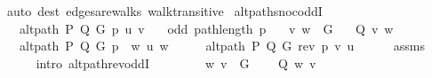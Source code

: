 \begin{isabellebody}
\ {\isacharparenleft}{\kern0pt}auto\ dest{\isacharcolon}{\kern0pt}\ edges{\isacharunderscore}{\kern0pt}are{\isacharunderscore}{\kern0pt}walks\ walk{\isacharunderscore}{\kern0pt}transitive{\isacharparenright}{\kern0pt}\isanewline
{}\isamarkupfalse%
%
\endisatagproof
{\isafoldproof}%
%
\isadelimproof
\isanewline
%
\endisadelimproof
\isanewline
{}\isamarkupfalse%
\ alt{\isacharunderscore}{\kern0pt}path{\isacharunderscore}{\kern0pt}snoc{\isacharunderscore}{\kern0pt}oddI{\isacharcolon}{\kern0pt}\isanewline
\ \ \ {\isachardoublequoteopen}alt{\isacharunderscore}{\kern0pt}path\ P\ Q\ G\ p\ u\ v{\isachardoublequoteclose}\isanewline
\ \ \ {\isachardoublequoteopen}odd\ {\isacharparenleft}{\kern0pt}path{\isacharunderscore}{\kern0pt}length\ p{\isacharparenright}{\kern0pt}{\isachardoublequoteclose}\isanewline
\ \ \ {\isachardoublequoteopen}{\isacharbraceleft}{\kern0pt}v{\isacharcomma}{\kern0pt}\ w{\isacharbraceright}{\kern0pt}\ {\isasymin}\ G{\isachardoublequoteclose}\isanewline
\ \ \ {\isachardoublequoteopen}Q\ {\isacharbraceleft}{\kern0pt}v{\isacharcomma}{\kern0pt}\ w{\isacharbraceright}{\kern0pt}{\isachardoublequoteclose}\isanewline
\ \ \ {\isachardoublequoteopen}alt{\isacharunderscore}{\kern0pt}path\ P\ Q\ G\ {\isacharparenleft}{\kern0pt}p\ {\isacharat}{\kern0pt}\ {\isacharbrackleft}{\kern0pt}w{\isacharbrackright}{\kern0pt}{\isacharparenright}{\kern0pt}\ u\ w{\isachardoublequoteclose}\isanewline
%
\isadelimproof
%
\endisadelimproof
%
\isatagproof
{}\isamarkupfalse%
\ {\isacharminus}{\kern0pt}\isanewline
\ \ \isamarkupfalse%
\ {\isachardoublequoteopen}alt{\isacharunderscore}{\kern0pt}path\ P\ Q\ G\ {\isacharparenleft}{\kern0pt}rev\ p{\isacharparenright}{\kern0pt}\ v\ u{\isachardoublequoteclose}\isanewline
\ \ \ \ \isamarkupfalse%
\ assms{\isacharparenleft}{\kern0pt}{}{\isacharcomma}{\kern0pt}\ {}{\isacharparenright}{\kern0pt}\isanewline
\ \ \ \ \isamarkupfalse%
\ {\isacharparenleft}{\kern0pt}intro\ alt{\isacharunderscore}{\kern0pt}path{\isacharunderscore}{\kern0pt}rev{\isacharunderscore}{\kern0pt}oddI{\isacharparenright}{\kern0pt}\isanewline
\ \ \isamarkupfalse%
\ \isamarkupfalse%
\isanewline
\ \ \ \ {\isachardoublequoteopen}{\isacharbraceleft}{\kern0pt}w{\isacharcomma}{\kern0pt}\ v{\isacharbraceright}{\kern0pt}\ {\isasymin}\ G{\isachardoublequoteclose}\isanewline
\ \ \ \ {\isachardoublequoteopen}Q\ {\isacharbraceleft}{\kern0pt}w{\isacharcomma}{\kern0pt}\ v{\isacharbraceright}{\kern0pt}{\isachardoublequoteclose}\isanewline

\end{isabellebody}
